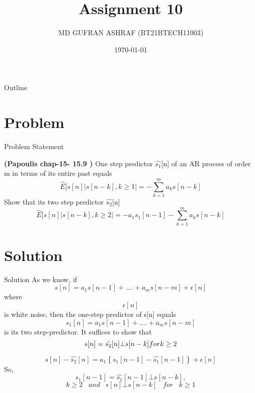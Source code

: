 \documentclass{beamer}
\title{Assignment 10 }
\author{MD GUFRAN ASHRAF (BT21BTECH11003)}
\date{\today}
\begin{document}
\begin{frame}
    \titlepage 
\end{frame}

\begin{frame}{Outline}
    \tableofcontents
\end{frame}


\section{Problem}
\begin{frame}{Problem Statement}

\textbf{(Papoulis chap-15- 15.9 )}
One step predictor $\hat{s_{1}}$[n] of an AR process of order m in terms of its entire past equals
\begin{equation*}
    \hat{E}[s[n]|s[n-k], k \geq 1| = -\sum_{k=1}^{m}a_{k}s[n-k]
\end{equation*}
Show that its two step predictor  $\hat{s_{2}}$[n]
\begin{equation*}
    \hat{E}[s[n]|s[n-k], k \geq 2| = -a_{1}s_{1}[n-1] - \sum_{k=1}^{m}a_{k}s[n-k]
\end{equation*}

 
\end{frame}


\section{Solution}
\begin{frame}{Solution}
As we know, if 
\begin{equation}
    s[n] = a_{1}s[n-1] + ....+ a_{m}s[n-m] + \epsilon [n]
\end{equation}
where $$\epsilon [n]$$ is white noise, then the one-step predictor of s[n] equals
\begin{equation}
    s_{1}[n] = a_{1}s[n-1] + ....+ a_{m}s[n-m] 
\end{equation}
is its two step-predictor. It suffices to show that
\begin{equation*}
    s[n] = \hat{s_{2}}[n] \bot s[n-k]\\
    for k \geq 2
\end{equation*}
\end{frame} 

\begin{frame}
\begin{equation}
    s[n] - \hat{s_{2}}[n] = a_{1}\left\{s_{1}[n-1] - \hat{s_{1}}[n-1] \right\} + \epsilon [n]
\end{equation}
So,
\begin{equation*}
     s_{1}[n-1] = \hat{s_{1}}[n-1] \bot s[n-k],
\end{equation*}
\begin{equation*}
     k \geq 2 \;\;\; and \;\;\; \epsilon[n] \bot s[n-k] \;\;\; for \;\;\; k \geq 1
\end{equation*}
\end{frame}
\end{document}
